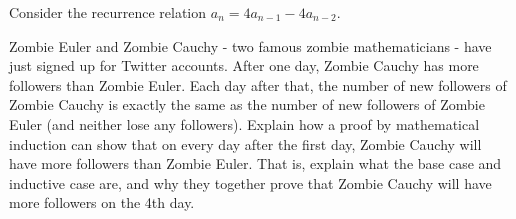 \begin{questions}
\begin{parts}
\end{parts}






\question Consider the recurrence relation $a_n = 4a_{n-1} - 4a_{n-2}$.







\question Zombie Euler and Zombie Cauchy - two famous zombie mathematicians - have just signed up for Twitter accounts.  After one day, Zombie Cauchy has more followers than Zombie Euler.  Each day after that, the number of new followers of Zombie Cauchy is exactly the same as the number of new followers of Zombie Euler (and neither lose any followers).  Explain how a proof by mathematical induction can show that on every day after the first day, Zombie Cauchy will have more followers than Zombie Euler.  That is, explain what the base case and inductive case are, and why they together prove that Zombie Cauchy will have more followers on the 4th day.


\end{questions}
